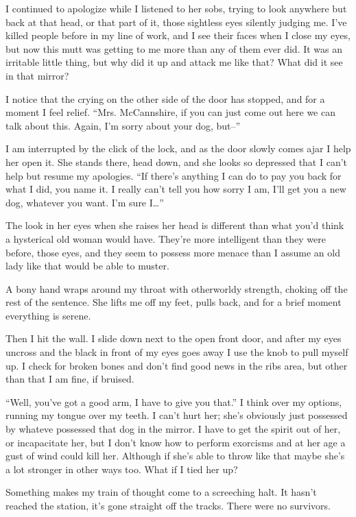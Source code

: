 I continued to apologize while I listened to her sobs, trying to look
anywhere but back at that head, or that part of it, those sightless eyes
silently judging me. I've killed people before in my line of work, and I
see their faces when I close my eyes, but now this mutt was getting to
me more than any of them ever did. It was an irritable little thing, but
why did it up and attack me like that? What did it see in that mirror?

I notice that the crying on the other side of the door has stopped, and
for a moment I feel relief. ``Mrs. McCannshire, if you can just come out
here we can talk about this. Again, I'm sorry about your dog, but--''

I am interrupted by the click of the lock, and as the door slowly comes
ajar I help her open it. She stands there, head down, and she looks so
depressed that I can't help but resume my apologies. ``If there's
anything I can do to pay you back for what I did, you name it. I really
can't tell you how sorry I am, I'll get you a new dog, whatever you
want. I'm sure I\ldots{}''

The look in her eyes when she raises her head is different than what
you'd think a hysterical old woman would have. They're more intelligent
than they were before, those eyes, and they seem to possess more menace
than I assume an old lady like that would be able to muster.

A bony hand wraps around my throat with otherworldy strength, choking
off the rest of the sentence. She lifts me off my feet, pulls back, and
for a brief moment everything is serene.

Then I hit the wall. I slide down next to the open front door, and after
my eyes uncross and the black in front of my eyes goes away I use the
knob to pull myself up. I check for broken bones and don't find good
news in the ribs area, but other than that I am fine, if bruised.

``Well, you've got a good arm, I have to give you that.'' I think over my
options, running my tongue over my teeth. I can't hurt her; she's
obviously just possessed by whateve possessed that dog in the mirror. I
have to get the spirit out of her, or incapacitate her, but I don't know
how to perform exorcisms and at her age a gust of wind could kill
her. Although if she's able to throw like that maybe she's a lot
stronger in other ways too. What if I tied her up?

Something makes my train of thought come to a screeching halt. It hasn't
reached the station, it's gone straight off the tracks. There were no
survivors.

